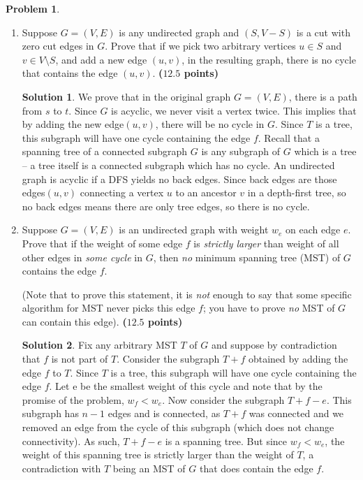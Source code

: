\documentclass{article}
\theoremstyle{definition}
\newtheorem{problem}{Problem}
\newtheorem*{solution*}{Solution}
\newenvironment{solution}{\begin{solution*}}{{} \end{solution*}}
\newcommand{\grade}[1]{\hfill{\textbf{($\mathbf{#1}$ points)}}}
\begin{document}
\begin{problem}\label{basics}~
\begin{enumerate}[label=(\alph*)]
	\item Suppose $G=(V,E)$ is any undirected graph and $(S,V-S)$ is a cut with zero cut edges in $G$. Prove that if we pick two arbitrary vertices $u \in S$ and $v \in V \setminus S$, and add a new edge $(u,v)$, in the resulting graph, there is no cycle that contains the edge $(u,v)$. 
	\grade{12.5}

\begin{solution}

	We prove that in the original graph $G = (V, E)$, there is a path from $s$ to $t$. Since $G$ is acyclic, we never visit a vertex twice. This implies that by adding the new edge$(u,v)$, there will be no cycle in $G$. Since $T$ is a tree, this subgraph will have one cycle containing the edge $f$. Recall that a spanning tree of a connected subgraph $G$ is any subgraph of $G$ which is a tree – a tree itself is a connected subgraph which has no cycle. An undirected graph is acyclic if a DFS yields no back edges. Since back edges are those edges$(u,v)$ connecting a vertex $u$ to an ancestor $v$ in a depth-first tree, so no back edges means there are only tree edges, so there is no cycle. \\

\end{solution}

	\newpage
	\item Suppose $G = (V,E)$ is an undirected graph with weight $w_e$ on each edge $e$. Prove that if the weight of some edge $f$ is \emph{strictly larger} than weight of  all other edges in \emph{some cycle} in $G$, then \emph{no} minimum spanning tree (MST) of $G$ contains the edge $f$. 
	
	(Note that to prove this statement, it is \emph{not} enough
	to say that some specific algorithm for MST never picks this edge $f$; you have to prove \emph{no} MST of $G$ can contain this edge). 
	 \grade{12.5}
	
	
\begin{solution}

	Fix any arbitrary MST $T$ of $G$ and suppose by contradiction that $f$ is not part of $T$. Consider the subgraph $T+f$ obtained by adding the edge $f$ to $T$. Since $T$ is a tree, this subgraph will have one cycle containing the edge $f$. Let e be the smallest weight of this cycle and note that by the promise of the problem, $w_f < w_e$. Now consider the subgraph $T+f-e$. This subgraph has $n-1$ edges and is connected, as $T+f$ was connected and we removed an edge from the cycle of this subgraph  (which does not change connectivity).  As such, $T+f - e$ is a spanning tree. But since $w_f < w_e$, the weight of this spanning tree is strictly larger than the weight of $T$, a contradiction with $T$ being an MST of $G$ that does contain the edge $f$.\\

\end{solution}
 
	
\end{enumerate}
\end{problem}
\end{document}
